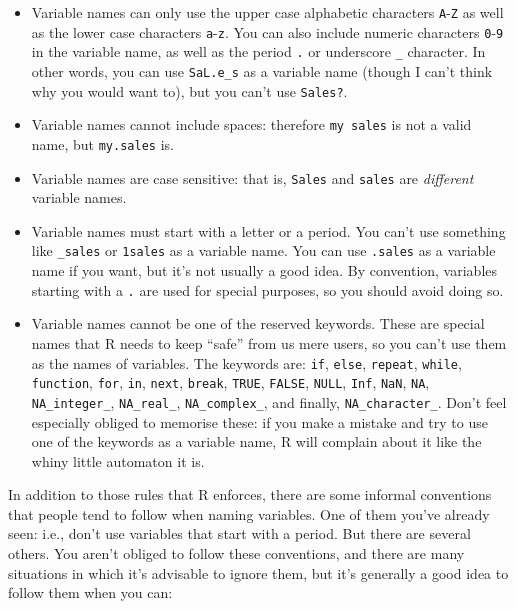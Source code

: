 \documentclass[
]{book}
\providecommand{\tightlist}{%
  \setlength{\itemsep}{0pt}\setlength{\parskip}{0pt}}
\begin{document}
\begin{itemize}
\tightlist
\item
  Variable names can only use the upper case alphabetic characters \texttt{A}-\texttt{Z} as well as the lower case characters \texttt{a}-\texttt{z}. You can also include numeric characters \texttt{0}-\texttt{9} in the variable name, as well as the period \texttt{.} or underscore \texttt{\_} character. In other words, you can use \texttt{SaL.e\_s} as a variable name (though I can't think why you would want to), but you can't use \texttt{Sales?}.
\item
  Variable names cannot include spaces: therefore \texttt{my\ sales} is not a valid name, but \texttt{my.sales} is.
\item
  Variable names are case sensitive: that is, \texttt{Sales} and \texttt{sales} are \emph{different} variable names.
\item
  Variable names must start with a letter or a period. You can't use something like \texttt{\_sales} or \texttt{1sales} as a variable name. You can use \texttt{.sales} as a variable name if you want, but it's not usually a good idea. By convention, variables starting with a \texttt{.} are used for special purposes, so you should avoid doing so.
\item
  Variable names cannot be one of the reserved keywords. These are special names that R needs to keep ``safe'' from us mere users, so you can't use them as the names of variables. The keywords are: \texttt{if}, \texttt{else}, \texttt{repeat}, \texttt{while}, \texttt{function}, \texttt{for}, \texttt{in}, \texttt{next}, \texttt{break}, \texttt{TRUE}, \texttt{FALSE}, \texttt{NULL}, \texttt{Inf}, \texttt{NaN}, \texttt{NA}, \texttt{NA\_integer\_}, \texttt{NA\_real\_}, \texttt{NA\_complex\_}, and finally, \texttt{NA\_character\_}. Don't feel especially obliged to memorise these: if you make a mistake and try to use one of the keywords as a variable name, R will complain about it like the whiny little automaton it is.
\end{itemize}

In addition to those rules that R enforces, there are some informal conventions that people tend to follow when naming variables. One of them you've already seen: i.e., don't use variables that start with a period. But there are several others. You aren't obliged to follow these conventions, and there are many situations in which it's advisable to ignore them, but it's generally a good idea to follow them when you can:
\end{document}
